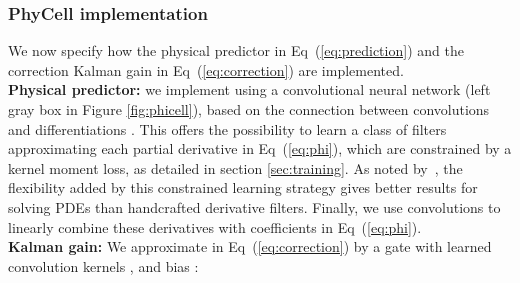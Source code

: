 \documentclass[10pt,twocolumn,letterpaper]{article}
\begin{document}
\subsubsection{PhyCell implementation}
We now specify how the physical predictor  in Eq~(\ref{eq:prediction}) and the correction Kalman gain  in Eq~(\ref{eq:correction}) are implemented.\vspace{0.25cm} \\ 
\textbf{Physical predictor:} we implement  using  a convolutional neural network (left gray box in Figure \ref{fig:phicell}), based on the connection between convolutions and differentiations \cite{dong2017image,long2018pde}.
This offers the possibility to learn a class of filters approximating each partial derivative in Eq~(\ref{eq:phi}), which are constrained by a kernel moment loss, as detailed in section \ref{sec:training}. As noted by~\cite{long2018pde}, the flexibility added by this constrained learning strategy gives better results for solving PDEs than handcrafted derivative filters.
Finally, we use  convolutions to linearly combine these derivatives with  coefficients in Eq~(\ref{eq:phi}). \vspace{0.25cm} \\\textbf{Kalman gain:}
We approximate  in Eq~(\ref{eq:correction}) by a gate with learned  convolution kernels ,  and bias :
\end{document}
